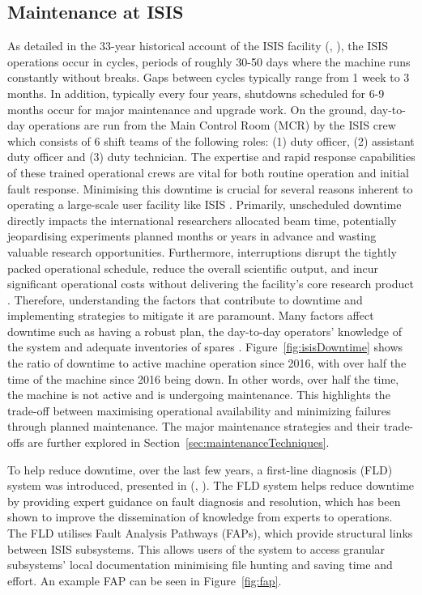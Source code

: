 \documentclass[10pt,oneside]{report}
\renewcommand{\citet}[1]{\citeauthor{#1}, \citeyear{#1}}
\begin{document}
\subsection{Maintenance at ISIS} 
As detailed in the 33-year historical account of the ISIS facility (\citet{thomason2019isis}), the ISIS operations occur in cycles, periods of roughly 30-50 days where the machine runs constantly without breaks. Gaps between cycles typically range from 1 week to 3 months. In addition, typically every four years, shutdowns scheduled for 6-9 months occur for major maintenance and upgrade work. On the ground, day-to-day operations are run from the Main Control Room (MCR) by the ISIS crew which consists of 6 shift teams of the following roles: (1) duty officer, (2) assistant duty officer and (3) duty technician.  The expertise and rapid response capabilities of these trained operational crews are vital for both routine operation and initial fault response.
Minimising this downtime is crucial for several reasons inherent to operating a large-scale user facility like ISIS \cite{thomason2019isis}. Primarily, unscheduled downtime directly impacts the international researchers allocated beam time, potentially jeopardising experiments planned months or years in advance and wasting valuable research opportunities. Furthermore, interruptions disrupt the tightly packed operational schedule, reduce the overall scientific output, and incur significant operational costs without delivering the facility's core research product \cite{thomason2019isis}. Therefore, understanding the factors that contribute to downtime and implementing strategies to mitigate it are paramount.
Many factors affect downtime such as having a robust plan, the day-to-day operators' knowledge of the system and adequate inventories of spares \cite{thomason2019isis}. Figure~\ref{fig:isisDowntime} shows the ratio of downtime to active machine operation since 2016, with over half the time of the machine since 2016 being down. In other words, over half the time, the machine is not active and is undergoing maintenance. This highlights the trade-off between maximising operational availability and minimizing failures through planned maintenance. The major maintenance strategies and their trade-offs are further explored in Section~\ref{sec:maintenanceTechniques}.

To help reduce downtime, over the last few years, a first-line diagnosis (FLD) system was introduced, presented in (\citet{fld2017}). The FLD system helps reduce downtime by providing expert guidance on fault diagnosis and resolution, which has been shown to improve the dissemination of knowledge from experts to operations. The FLD utilises Fault Analysis Pathways (FAPs), which provide structural links between ISIS subsystems. This allows users of the system to access granular subsystems' local documentation minimising file hunting and saving time and effort. An example FAP can be seen in Figure~\ref{fig:fap}.
\end{document}
